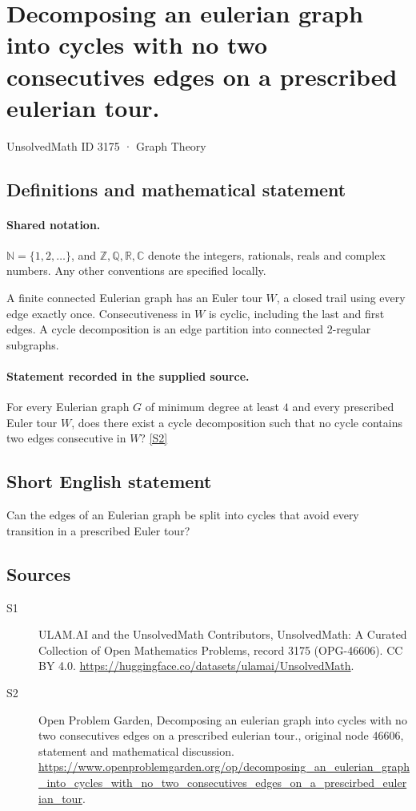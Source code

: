 \documentclass[11pt]{article}
\newcommand{\sref}[2]{\hyperlink{source:#1:#2}{[S#2]}}
\begin{document}
\setcounter{section}{3174}
\section{Decomposing an eulerian graph into cycles with no two consecutives edges on a prescribed eulerian tour.}\label{3175}
{\small\sffamily UnsolvedMath ID 3175 · Graph Theory}
\subsection{Definitions and mathematical statement}

\paragraph{Shared notation.}$\mathbb N=\{1,2,\ldots\}$, and $\mathbb Z,\mathbb Q,\mathbb R,\mathbb C$ denote the integers, rationals, reals and complex numbers. Any other conventions are specified locally.


A finite connected Eulerian graph has an Euler tour $W$, a closed trail using every edge exactly once. Consecutiveness in $W$ is cyclic, including the last and first edges. A cycle decomposition is an edge partition into connected $2$-regular subgraphs.
\paragraph{Statement recorded in the supplied source.}
For every Eulerian graph $G$ of minimum degree at least $4$ and every prescribed Euler tour $W$, does there exist a cycle decomposition such that no cycle contains two edges consecutive in $W$? \sref{3175}{2}
\subsection{Short English statement}
Can the edges of an Eulerian graph be split into cycles that avoid every transition in a prescribed Euler tour?
\subsection{Sources}
\begin{description}
\item[\hypertarget{source:3175:1}{S1}] ULAM.AI and the UnsolvedMath Contributors, UnsolvedMath: A Curated Collection of Open Mathematics Problems, record 3175 (OPG-46606). CC BY 4.0. \url{https://huggingface.co/datasets/ulamai/UnsolvedMath}.
\item[\hypertarget{source:3175:2}{S2}] Open Problem Garden, Decomposing an eulerian graph into cycles with no two consecutives edges on a prescribed eulerian tour., original node 46606, statement and mathematical discussion. \url{https://www.openproblemgarden.org/op/decomposing_an_eulerian_graph_into_cycles_with_no_two_consecutives_edges_on_a_prescirbed_eulerian_tour}.
\end{description}
\label{end:3175}
\end{document}
